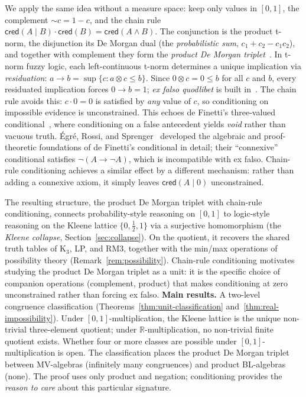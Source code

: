 \documentclass[11pt,a4paper]{article}
\newcommand{\cred}{\mathsf{cred}}
\newcommand{\negc}{\mathord{\sim}}
\begin{document}
We apply the same idea without a measure space:
keep only values in $[0,1]$, the complement $\negc c = 1 - c$, and the
chain rule
$\cred(A \mid B) \cdot \cred(B) = \cred(A \land B)$.
The conjunction is the product t-norm, the disjunction its De Morgan dual
(the \emph{probabilistic sum}, $c_1 + c_2 - c_1 c_2$),
and together with complement they form the
\emph{product De Morgan triplet}~\cite{klement2000,hajek1998}.
In t-norm fuzzy logic, each left-continuous t-norm determines a unique
implication via \emph{residuation}: $a \to b = \sup\{c : a \otimes c \leq b\}$.
Since $0 \otimes c = 0 \leq b$ for all $c$ and $b$, every residuated
implication forces $0 \to b = 1$; \emph{ex falso quodlibet} is built
in~\cite{hajek1998}.
The chain rule avoids this: $c \cdot 0 = 0$ is satisfied by \emph{any}
value of $c$, so conditioning on impossible evidence is unconstrained.
This echoes de Finetti's three-valued conditional~\cite{definetti1936},
where conditioning on a false antecedent yields \emph{void} rather than
vacuous truth.
\'Egr\'e, Rossi, and Sprenger~\cite{egre2021} developed the algebraic
and proof-theoretic foundations of de Finetti's conditional in detail;
their ``connexive'' conditional satisfies $\neg(A \to \neg A)$, which
is incompatible with ex falso.
Chain-rule conditioning achieves a similar effect by a different mechanism:
rather than adding a connexive axiom, it simply leaves $\cred(A \mid 0)$
unconstrained.

The resulting structure, the product De Morgan triplet with chain-rule
conditioning, connects probability-style reasoning on $[0,1]$ to
logic-style reasoning on the Kleene lattice
$\{0, \tfrac{1}{2}, 1\}$ via a surjective homomorphism (the
\emph{Kleene collapse}, Section~\ref{sec:collapse}).
On the quotient, it recovers the shared truth tables of K$_3$, LP,
and RM3, together with the min/max operations of possibility theory
(Remark~\ref{rem:possibility}).
Chain-rule conditioning motivates studying the product De Morgan triplet
as a unit: it is the specific choice of companion operations
(complement, product) that makes conditioning at zero unconstrained
rather than forcing ex falso.
\textbf{Main results.}
A two-level congruence classification
(Theorems~\ref{thm:unit-classification}
and~\ref{thm:real-impossibility}).
Under $[0,1]$-multiplication, the Kleene lattice is the unique
non-trivial three-element quotient; under $\mathbb{R}$-multiplication,
no non-trivial finite quotient exists.
Whether four or more classes are possible under
$[0,1]$-multiplication is open.
The classification places the product De Morgan triplet between
MV-algebras (infinitely many congruences) and product BL-algebras
(none).
The proof uses only product and negation; conditioning provides
the \emph{reason to care} about this particular signature.
\end{document}
